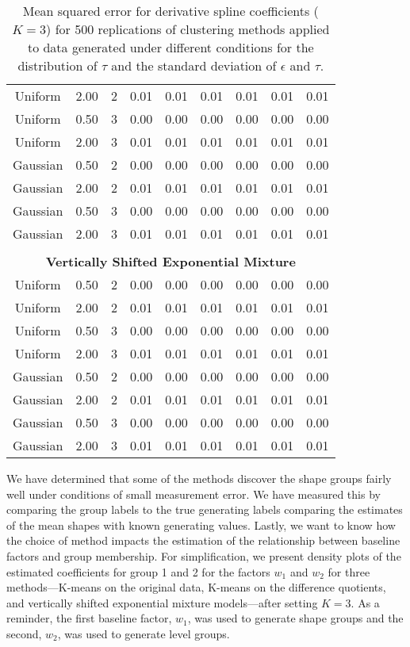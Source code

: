 \begin{table}[ht]
\begin{center}
\begin{tabular}{ccc|cccccc}
  Uniform & 2.00 &   2 & 0.01 & 0.01 & 0.01 & 0.01 & 0.01 & 0.01 \\ 
  Uniform & 0.50 &   3 & 0.00 & 0.00 & 0.00 & 0.00 & 0.00 & 0.00 \\ 
  Uniform & 2.00 &   3 & 0.01 & 0.01 & 0.01 & 0.01 & 0.01 & 0.01 \\ 
  Gaussian & 0.50 &   2 & 0.00 & 0.00 & 0.00 & 0.00 & 0.00 & 0.00 \\ 
  Gaussian & 2.00 &   2 & 0.01 & 0.01 & 0.01 & 0.01 & 0.01 & 0.01 \\ 
  Gaussian & 0.50 &   3 & 0.00 & 0.00 & 0.00 & 0.00 & 0.00 & 0.00 \\ 
  Gaussian & 2.00 &   3 & 0.01 & 0.01 & 0.01 & 0.01 & 0.01 & 0.01 \\ 
   \\ \multicolumn{9}{c}{\textbf{Vertically Shifted Exponential Mixture}}\\Uniform & 0.50 &   2 & 0.00 & 0.00 & 0.00 & 0.00 & 0.00 & 0.00 \\ 
  Uniform & 2.00 &   2 & 0.01 & 0.01 & 0.01 & 0.01 & 0.01 & 0.01 \\ 
  Uniform & 0.50 &   3 & 0.00 & 0.00 & 0.00 & 0.00 & 0.00 & 0.00 \\ 
  Uniform & 2.00 &   3 & 0.01 & 0.01 & 0.01 & 0.01 & 0.01 & 0.01 \\ 
  Gaussian & 0.50 &   2 & 0.00 & 0.00 & 0.00 & 0.00 & 0.00 & 0.00 \\ 
  Gaussian & 2.00 &   2 & 0.01 & 0.01 & 0.01 & 0.01 & 0.01 & 0.01 \\ 
  Gaussian & 0.50 &   3 & 0.00 & 0.00 & 0.00 & 0.00 & 0.00 & 0.00 \\ 
  Gaussian & 2.00 &   3 & 0.01 & 0.01 & 0.01 & 0.01 & 0.01 & 0.01 \\ 
   \hline\end{tabular}
\caption{Mean squared error for derivative spline coefficients ($K=3$) for 500 replications of clustering methods applied to data generated under different conditions for the distribution of $\tau$ and the standard deviation of $\epsilon$ and $\tau$.}
\label{tab:mse3}
\end{center}
\end{table}
We have determined that some of the methods discover the shape groups fairly well under conditions of small measurement error. We have measured this by comparing the group labels to the true generating labels comparing the estimates of the mean shapes with known generating values. Lastly, we want to know how the choice of method impacts the estimation of the relationship between baseline factors and group membership. For simplification, we present density plots of the estimated coefficients for group 1 and 2 for the factors $w_{1}$ and $w_{2}$ for three methods---K-means on the original data, K-means on the difference quotients, and vertically shifted exponential mixture models---after setting $K=3$. As a reminder, the first baseline factor, $w_{1}$, was used to generate shape groups and the second, $w_{2}$, was used to generate level groups. 

